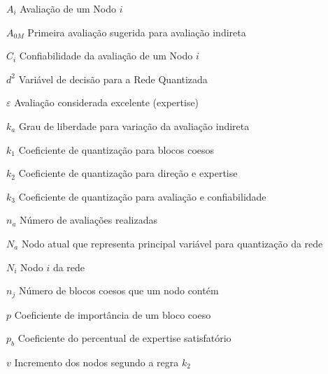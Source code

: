 \begin{simbolos}
  \item[ \(A_i\)] Avaliação de um Nodo \(i\)
  \item[\(A_{0M}\)] Primeira avaliação sugerida para avaliação indireta
  \item[\(C_i\)] Confiabilidade da avaliação de um Nodo \(i\)
  \item[\(d^2\)] Variável de decisão para a Rede Quantizada
  \item[\(\varepsilon\)] Avaliação considerada excelente (expertise)
  \item[\(k_a\)] Grau de liberdade para variação da avaliação indireta
  \item[\(k_1\)] Coeficiente de quantização para blocos coesos
  \item[\(k_2\)] Coeficiente de quantização para direção e expertise
  \item[\(k_3\)] Coeficiente de quantização para avaliação e confiabilidade
  \item[\(n_a\)] Número de avaliações realizadas
  \item[\(N_a\)] Nodo atual que representa principal variável para quantização da rede
  \item[\(N_i\)] Nodo \(i\) da rede
  \item[\(n_j\)] Número de blocos coesos que um nodo contém
  \item[\(p\)] Coeficiente de importância de um bloco coeso
  \item[\(p_b\)] Coeficiente do percentual de expertise satisfatório
  \item[\(v\)] Incremento dos nodos segundo a regra \(k_2\) 
\end{simbolos}
